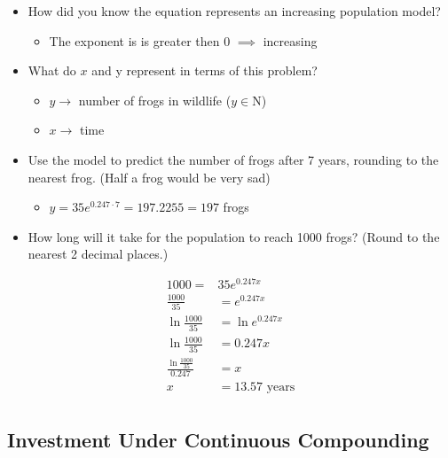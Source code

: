 \documentclass{book}
\begin{document}
\begin{itemize}
	\item
	      How did you know the equation represents an increasing population
	      model?

	      \begin{itemize}
		      \tightlist
		      \item
		            The exponent is is greater then 0 \(\implies\) increasing
	      \end{itemize}
	\item
	      What do \(x\) and y represent in terms of this problem?

	      \begin{itemize}
		      \tightlist
		      \item
		            \(y \rightarrow\) number of frogs in wildlife (\(y \in \mathrm{N}\))
		      \item
		            \(x \rightarrow\) time
	      \end{itemize}
	\item
	      Use the model to predict the number of frogs after 7 years, rounding
	      to the nearest frog. (Half a frog would be very sad)

	      \begin{itemize}
		      \tightlist
		      \item
		            \(y=35e^{0.247 \cdot 7} = 197.2255 = 197\) frogs
	      \end{itemize}
	\item
	      How long will it take for the population to reach 1000 frogs? (Round
	      to the nearest 2 decimal places.)
\end{itemize}


	\begin{align}
		1000= & 35e^{0.247x} \\ \frac{1000}{35} &= e^{0.247x} \\ \ln \frac{1000}{35} &= \ln e^{0.247x} \\ \ln \frac{1000}{35} &= 0.247x \\ \frac{\ln \frac{1000}{35}}{0.247} &=  x \\ x &= 13.57 \text{ years}\\
	\end{align}


\subsection{Investment Under Continuous
	Compounding}\label{investment-under-continuous-compounding}
\end{document}

